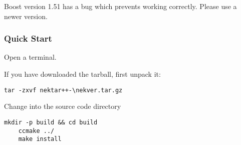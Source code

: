 \begin{warningbox}
Boost version 1.51 has a bug which prevents \nekpp working correctly.
Please use a newer version.
\end{warningbox}


\subsubsection{Quick Start}
Open a terminal.

If you have downloaded the tarball, first unpack it:
\begin{lstlisting}[style=BashInputStyle]
    tar -zxvf nektar++-\nekver.tar.gz
\end{lstlisting}
Change into the  source code directory
\begin{lstlisting}[style=BashInputStyle]
    mkdir -p build && cd build 
    ccmake ../
    make install
\end{lstlisting}

